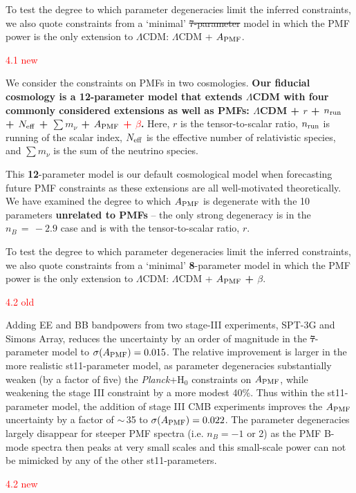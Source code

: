 \documentclass{article}
\newcommand{\apmf}{\ensuremath{A_{\rm PMF}}}
\newcommand{\lcdm}{\ensuremath{\Lambda}CDM}
\newcommand{\nrun}{\ensuremath{n_{\rm run}}}
\newcommand{\neff}{\ensuremath{N_{\rm eff}}}
\newcommand{\ho}{H\ensuremath{_0}}
\newcommand{\mnu}{\ensuremath{\sum m_\nu}}
\newcommand{\planck}{{\sl Planck}}
\newcommand{\sptnew}{SPT-3G}
\newcommand{\simons}{Simons Array}
\newcommand{\changed}[1]{\textcolor{Red}{#1}}
\newcommand{\removed}[1]{\st{#1}}
\newcommand{\added}[1]{\textbf{#1}}
\begin{document}
{To test the degree to which parameter degeneracies limit the inferred constraints,  we also quote constraints from a `minimal' \removed{7-parameter} model in which the PMF power is the only extension to \lcdm{}:  \lcdm{} + \apmf.

\changed{4.1 new}

We consider the constraints on PMFs in two cosmologies. 
\added{Our fiducial cosmology is a \added{12}-parameter model that extends \lcdm{} with  four  commonly considered extensions as well as PMFs:  \lcdm{} +  $r$ + \nrun{} +  \neff{} + \mnu{} + \apmf{} \changed{ + $\beta$}.}
Here, $r$ is the tensor-to-scalar ratio, \nrun{} is running of the scalar index, \neff{} is the effective number of relativistic species, and \mnu{} is the sum of the neutrino species.

This \added{12}-parameter model is our default cosmological model when forecasting future PMF constraints as these extensions are all well-motivated theoretically. 
We have examined the degree to which \apmf{} is degenerate with the 10 parameters \added{unrelated to PMFs} -- the only strong degeneracy is in the $n_B\,=\,-2.9$ case and is with the tensor-to-scalar ratio, $r$. 

To test the degree to which parameter degeneracies limit the inferred constraints,  we also quote constraints from a `minimal' \added{8}-parameter model in which the PMF power is the only extension to \lcdm{}:  \lcdm{} + \apmf{} \added{ + $\beta$}.

\changed{4.2 old}

Adding  EE and BB bandpowers from two stage-III experiments, \sptnew{} and \simons{}, reduces the uncertainty by an order of magnitude in the \st{7}-parameter model to $\sigma(\apmf)=0.015$. 
The relative improvement is larger in the more realistic st{11}-parameter model, as parameter degeneracies substantially weaken (by a factor of five) the \planck+\ho{} constraints on \apmf{}, while weakening the stage III constraint by a  more modest 40\%. 
Thus within the st{11}-parameter model,  the addition of stage III CMB experiments improves the \apmf{} uncertainty by a factor of $\sim$\,35 to  $\sigma(\apmf)=0.022$. 
The parameter degeneracies largely disappear for steeper PMF spectra (i.e. $n_B=-1$ or 2) as the PMF B-mode spectra then peaks at very small scales and this small-scale power can not be mimicked by any of the other st{11}-parameters. 

\changed{4.2 new}

}
\end{document}
